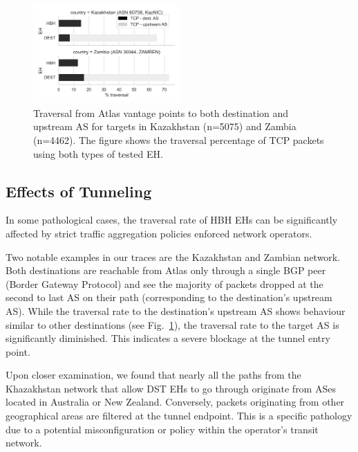 \documentclass[conference]{IEEEtran}
\begin{document}

\begin{figure}
\centering
  \includegraphics[width=0.5\textwidth]{traversal-pathologies.png}
  \caption{Traversal from Atlas vantage points to both destination and upstream
AS for targets in Kazakhstan (n=5075) and Zambia (n=4462). The figure shows the
traversal percentage of TCP packets using both types of tested EH.}
  \label{fig:traversal_pathologies}
\end{figure}

\subsection{Effects of Tunneling}
    \label{subsec: pathologies}

In some pathological cases, the traversal rate of HBH EHs can be significantly
affected by strict traffic aggregation policies enforced network operators.

Two notable examples in our traces are the Kazakhstan and Zambian network.
Both destinations are reachable from Atlas only through a single BGP peer
(Border Gateway Protocol) and see the majority of packets dropped at the
second to last AS on their path (corresponding to the destination's upstream AS).
While the traversal rate to the destination's upstream AS shows behaviour
similar to other destinations (see Fig.~\ref{fig:traversal_pathologies}),
the traversal rate to the target AS is significantly diminished. This indicates a
severe blockage at the tunnel entry point.


Upon closer examination, we found that nearly all the paths from the
Khazakhstan network that allow DST EHs to go through originate from ASes
located in Australia or New Zealand. Conversely, packets originating from other
geographical areas are filtered at the tunnel endpoint. This is a specific
pathology due to a potential misconfiguration or policy within the operator's
transit network.
\end{document}

